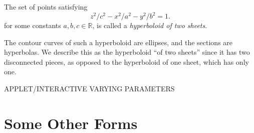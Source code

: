 \documentclass{ximera}
\begin{document}
\begin{example}
The set of points satisfying
\[
z^2/c^2 -x^2/a^2 - y^2/b^2 =1.
\]
for some constants $a,b,c\in\mathbb{R}$, is called a \emph{hyperboloid of two sheets}.

\begin{image}
\end{image}

The contour curves of such a hyperboloid are ellipses, and the sections are hyperbolas. We describe this as the hyperboloid ``of two sheets'' since it has two disconnected pieces, as opposed to the hyperboloid of one sheet, which has only one.
\end{example}

APPLET/INTERACTIVE VARYING PARAMETERS

\section{Some Other Forms}
\end{document}
